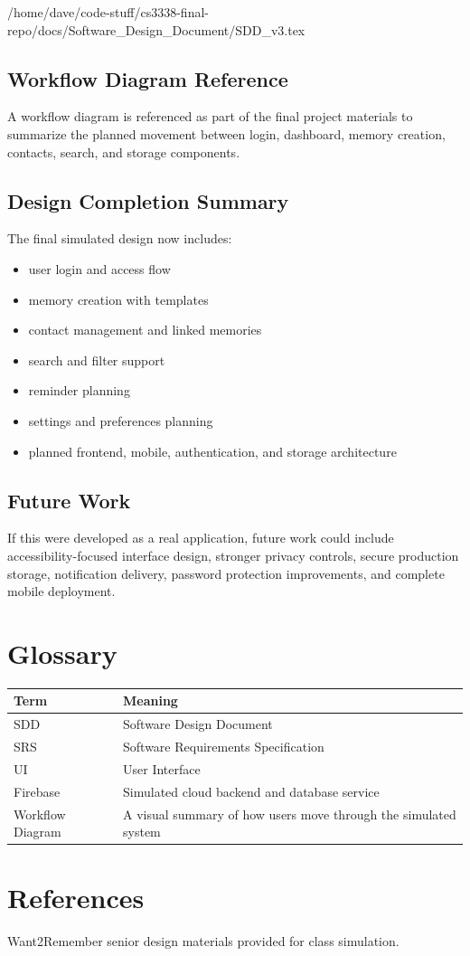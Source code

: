 /home/dave/code-stuff/cs3338-final-repo/docs/Software_Design_Document/SDD_v3.tex\documentclass{article}
\begin{document}
\subsection{Workflow Diagram Reference}

A workflow diagram is referenced as part of the final project materials to summarize the planned movement between login, dashboard, memory creation, contacts, search, and storage components.

\subsection{Design Completion Summary}

The final simulated design now includes:
\begin{itemize}
    \item user login and access flow
    \item memory creation with templates
    \item contact management and linked memories
    \item search and filter support
    \item reminder planning
    \item settings and preferences planning
    \item planned frontend, mobile, authentication, and storage architecture
\end{itemize}

\subsection{Future Work}

If this were developed as a real application, future work could include accessibility-focused interface design, stronger privacy controls, secure production storage, notification delivery, password protection improvements, and complete mobile deployment.

\section{Glossary}
\begin{longtable}{|p{3cm}|p{10cm}|}
\hline
Term & Meaning \\ \hline
SDD & Software Design Document \\ \hline
SRS & Software Requirements Specification \\ \hline
UI & User Interface \\ \hline
Firebase & Simulated cloud backend and database service \\ \hline
Workflow Diagram & A visual summary of how users move through the simulated system \\ \hline
\end{longtable}

\section{References}
Want2Remember senior design materials provided for class simulation.
\end{document}

